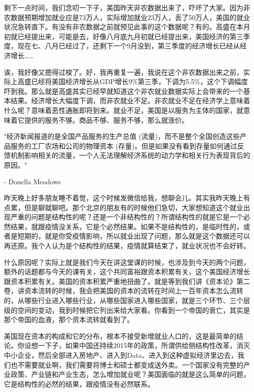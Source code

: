 \documentclass[UTF8, 12pt, a4paper]{ctexrep}
\begin{document}
剩下一点时间，我们念叨一下子，美国昨天非农数据出来了，吓坏了大家。因为非农数据预期增加就业应是73万人，实际增加就业23万人，丢了50万人，美国的就业状况急转直下。有没有非农数据之前就预见此事的这个数据呢？有的。高盛在本月初就已经提出来，可能是去，好像八月底九月初就已经提出来，美国经济的第三季度，现在七、八月已经过了，还剩下一个9月没到，第三季度的经济增长已经从经济增长……

诶，我好像又摁得过梭了。好，我再重复一遍，我说在这个非农数据出来之前，实际上高盛已经将美国经济增长从GDP增长9\%第三季，下调为5.5\%，这个下调幅度吓到我。那么就是高盛其实已经早就知道这个非农就业数据实际上会带来的一个基本结果。经济增长大幅度下调，而非农就业不足。非农就业不足在经济学上意味着什么呢？意味着恶性通胀即将到来。就业不足，美国是以服务为主体的国家，就意味着它提供的服务不够。商品不够、服务不够，那么就涨价。

{\kaishu  "经济新闻报道的是全国产品服务的生产总值 (流量)，而不是整个全国创造这些产品服务的工厂农场和公司的物理资本 (存量)。但是如果没有看到存量如何通过反馈机制影响相关的流量，一个人无法理解经济系统的动力学和相关行为表现背后的原因。" }

{\kaishu - Donella Meadows}

昨天晚上好多朋友睡不着觉，这个时候发微信给我，想聊会儿。其实我昨天晚上有点累，但是聊就聊吧。那个北京的朋友有的时候他们急切，大家想知道这个就业出现严重的问题是结构性的呢？还是一个非结构性的？所谓结构性的就是它是一个必然结果，就跟疫情没关系，它是个必然结果。如果不是结构性的，是临时性的，或者是短期的，就是你受疫情影响，所以就业出现了问题，那么就是这个数据还可以再还原。我个人认为是个结构性的结果，疫情就算结束了，就业状况也不会好转。

什么原因呢？实际上就是我们今天在讲这堂课的时候，也涉及到今天的两个问题，额外的话题都与今天的课有关，这个共同富裕跟资本积累有关，这个美国经济增长跟资本积累有关。美国的资本积累严重地扭曲了。就是等到我们讲《资本论》第二卷，讲资本流转的时候，我会把美国的资本的流转在时间上一百年资本怎么流转的，从哪些行业进入哪些行业，从哪些国家进入哪些国家，就是三个环节、三个层级的空间的变动，我到时候把它列出来给大家看。你看到一个帝国的衰亡，其实是那个帝国的血液，那个资本流转就看到了。

美国现在资本的构成和它的分布，根本不接受新增就业人口的，这是最简单的结论。你设想一下子，如果中国还持续2015年的政策，所谓供给侧结构性改革，消灭中小企业，然后全部进入房地产、进入到Data、进入到这种虚拟经济里边去，我们也不需要就业啊，我们需要将博士和硕士都变成送外卖。一个国家没有完整的产业政策、产业链和产业生态，怎么增加就业呢？美国面临的就是这么简单的问题，它是结构性的必然的结果，跟疫情没有必然联系。
\end{document}
